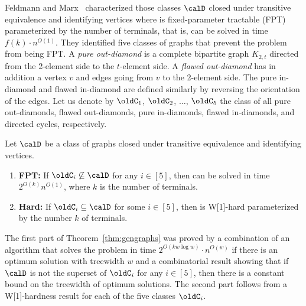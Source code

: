 Feldmann and Marx~\cite{FeldmannM16} characterized those classes $\calD$ closed under transitive equivalence and identifying vertices where \Dsngenfull is fixed-parameter tractable (FPT) parameterized by the number of terminals, that is, can be solved in time $f(k)\cdot n^{O(1)}$. They identified five classes of graphs that prevent the problem from being FPT. A \emph{pure out-diamond} is a complete bipartite graph $K_{2,t}$ directed from the 2-element side to the $t$-element side. A \emph{flawed out-diamond} has in addition  a vertex $v$ and edges going from $v$ to the 2-element side. The pure in-diamond and flawed in-diamond are defined similarly by reversing the orientation of the edges. 
Let us denote by $\oldC_1$, $\oldC_2$, $\dots$, $\oldC_5$ the class of all pure out-diamonds, flawed out-diamonds,
pure in-diamonds, flawed in-diamonds, and directed cycles, respectively.
\begin{theorem}\label{thm:gengraphs}
  Let $\calD$ be a class of graphs closed under transitive equivalence and identifying vertices.
  \begin{enumerate}
\item \textbf{FPT:}   If $\oldC_i\not\subseteq \calD$ for any $i\in [5]$, then \Dsngenfull can be solved in time $2^{O(k)}n^{O(1)}$, where $k$ is the number of terminals.
\item \textbf{Hard:}   If $\oldC_i\subseteq\calD$ for some $i\in [5]$, then \Dsngenfull is W[1]-hard parameterized by the number $k$ of terminals.
  \end{enumerate}
\end{theorem}
The first part of Theorem~\ref{thm:gengraphs} was proved by a combination of an algorithm that solves the problem in time $2^{O(kw\log w)}\cdot n^{O(w)}$ if there is an optimum solution with treewidth $w$ and a combinatorial result showing that if $\calD$ is not the superset of $\oldC_i$ for any $i\in[5]$, then there is a constant bound on the treewidth of optimum solutions. The second part follows from a W[1]-hardness result for each of the five classes $\oldC_i$.

